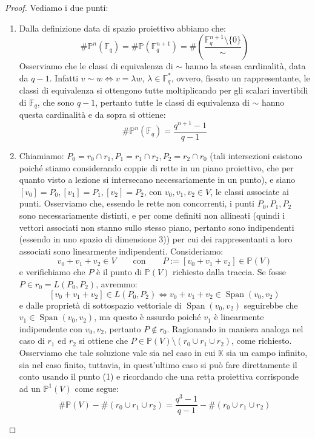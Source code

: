 \documentclass[12pt]{article}
\theoremstyle{remark}
\theoremstyle{definition}
\newenvironment{solution}{\renewcommand{\proofname}{Soluzione}\begin{proof}}{\end{proof}}
\newcommand{\PP}{\mathbb{P}}
\newcommand{\FF}{\mathbb{F}}
\newcommand{\KK}{\mathbb{K}}
\DeclareMathOperator{\Span}{Span}
\begin{document}
\begin{solution}
  Vediamo i due punti:
  \begin{enumerate}[(1)]
    \item Dalla definizione data di spazio proiettivo abbiamo che:
    \[ \#\PP^n(\FF_q) = \#\PP(\FF_q^{n+1})= \#\left(\frac{\FF_q^{n+1}\setminus\{0\}}{\sim}\right)
      \]
    Osserviamo che le classi di equivalenza di $\sim$ hanno la stessa cardinalità, data da $q-1$. Infatti $v \sim w \iff v = \lambda w$, $\lambda\in \FF_q^*$, ovvero, fissato un rappresentante, le classi di equivalenza si ottengono tutte moltiplicando per gli scalari invertibili di $\FF_q$, che sono $q-1$,
    pertanto tutte le classi di equivalenza di $\sim$ hanno questa cardinalità e da sopra si ottiene:
    \[ \#\PP^n(\FF_q) = \frac{q^{n+1} - 1}{q - 1}
      \]
    \item Chiamiamo: $P_0 = r_0 \cap r_1, P_1 = r_1 \cap r_2, P_2 = r_2 \cap r_0$ (tali intersezioni esistono poiché stiamo considerando coppie di rette in un piano proiettivo, che per quanto visto a lezione si intersecano necessariamente in un punto), e siano $[v_0] = P_0, [v_1] = P_1, [v_2] = P_2$, con $v_0,v_1,v_2 \in V$, le classi associate ai punti. Osserviamo che, essendo le rette non concorrenti, i punti $P_0,P_1,P_2$ sono necessariamente distinti,
    e per come definiti non allineati (quindi i vettori associati non stanno sullo stesso piano, pertanto sono indipendenti (essendo in uno spazio di dimensione 3))
    per cui dei rappresentanti a loro associati sono linearmente indipendenti.
    Consideriamo:
    \[ v_0 + v_1 + v_2 \in V \qquad \text{con} \qquad P := [v_0 + v_1 + v_2] \in \PP(V)
      \]
    e verifichiamo che $P$ è il punto di $\PP(V)$ richiesto dalla traccia. Se fosse $P \in r_0 = L(P_0,P_2)$, avremmo:
    \[ [v_0 + v_1 + v_2] \in L(P_0,P_2) \iff v_0 + v_1 + v_2 \in \Span(v_0,v_2)
      \]
    e dalle proprietà di sottospazio vettoriale di $\Span(v_0,v_2)$ seguirebbe che $v_1 \in \Span(v_0,v_2)$, ma questo è assurdo poiché $v_1$ è linearmente indipendente con $v_0,v_2$, pertanto $P \not \in r_0$. Ragionando in maniera analoga nel caso di $r_1$ ed $r_2$ si ottiene che $P \in \PP(V)\setminus(r_0 \cup r_1 \cup r_2)$, come richiesto.\\
    Osserviamo che tale soluzione vale sia nel caso in cui $\KK$ sia un campo infinito, sia nel caso finito, tuttavia, in quest'ultimo caso si può fare direttamente il conto usando il punto (1) e ricordando che una retta proiettiva corrisponde ad un $\PP^1(V)$ come segue:
    \[ \#\PP(V) - \#(r_0 \cup r_1 \cup r_2) = \frac{q^{3} - 1}{q - 1} - \#(r_0 \cup r_1 \cup r_2)
\]
\end{enumerate}
\end{solution}
\end{document}
